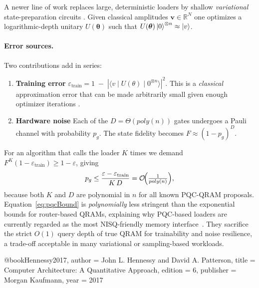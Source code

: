 \documentclass[11pt]{article}
\begin{document}
A newer line of work replaces large, deterministic loaders by shallow
\emph{variational} state-preparation circuits
\cite{Benedetti2019,Du2022}.  
Given classical amplitudes \(\mathbf{v}\in\mathbb{R}^{N}\) one optimizes
a logarithmic-depth unitary
\(U(\boldsymbol{\theta})\) such that
\(U(\boldsymbol{\theta})\ket{0}^{\otimes n}\approx\ket{v}\).

\paragraph{Error sources.}
Two contributions add in series:

\begin{enumerate}
\item \textbf{Training error}  
      \(
  \varepsilon_{\text{train}}
    = 1 \;-\; \left|\langle v \mid U(\theta)\mid 0^{\otimes n}\rangle\right|^{2}
\).
      This is a \emph{classical} approximation error that can be made
      arbitrarily small given enough optimizer iterations
      \cite{Du2022}.

\item \textbf{Hardware noise}  
      Each of the \(D=\Theta(poly(n))\) gates undergoes a Pauli
      channel with probability \(p_{g}\).
      The state fidelity becomes
      \(F\approx (1-p_{g})^{D}\).
\end{enumerate}

For an algorithm that calls the loader \(K\) times we demand  
\(F^{K}(1-\varepsilon_{\text{train}})\ge 1-\varepsilon\), giving
\begin{equation}
   p_{g}
     \le \frac{\varepsilon-\varepsilon_{\text{train}}}{K\,D}
     = \mathcal{O}\!\Bigl(\tfrac{1}{poly(n)}\Bigr),
   \label{eq:pqcBound}
\end{equation}
because both \(K\) and \(D\) are polynomial in \(n\)
for all known PQC-QRAM proposals.
Equation~\eqref{eq:pqcBound} is \emph{polynomially} less stringent than
the exponential bounds for router-based QRAMs, explaining why
PQC-based loaders are currently regarded as the most NISQ-friendly
memory interface~\cite{Gilyen2023}.
They sacrifice the strict \(O(1)\) query depth of true QRAM for
trainability and noise resilience, a trade-off acceptable in many
variational or sampling-based workloads.

\printbibliography

@book{Hennessy2017,
  author    = {John L. Hennessy and David A. Patterson},
  title     = {Computer Architecture: A Quantitative Approach},
  edition   = {6},
  publisher = {Morgan Kaufmann},
  year      = {2017}
}
\end{document}

